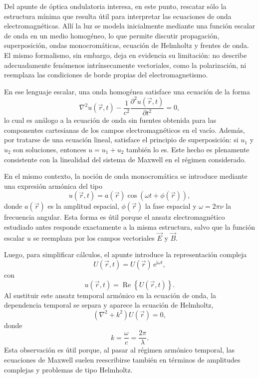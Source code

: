\documentclass[12pt,a4paper]{article}
\theoremstyle{definition}
\theoremstyle{plain}
\numberwithin{equation}{section}
\theoremstyle{remark}
\newcommand{\ii}{\mathrm{i}}
\newcommand{\ee}{\mathrm{e}}
\newcommand{\E}{\vec{E}}
\newcommand{\B}{\vec{B}}
\begin{document}
Del apunte de óptica ondulatoria interesa, en este punto, rescatar sólo la estructura mínima que resulta útil para interpretar las ecuaciones de onda electromagnéticas. Allí la luz se modela inicialmente mediante una función escalar de onda en un medio homogéneo, lo que permite discutir propagación, superposición, ondas monocromáticas, ecuación de Helmholtz y frentes de onda. El mismo formalismo, sin embargo, deja en evidencia su limitación: no describe adecuadamente fenómenos intrínsecamente vectoriales, como la polarización, ni reemplaza las condiciones de borde propias del electromagnetismo.

En ese lenguaje escalar, una onda homogénea satisface una ecuación de la forma
\begin{equation*}
    \nabla^2 u(\vec r,t)-\frac{1}{c^2}\frac{\partial^2 u(\vec r,t)}{\partial t^2}=0,
\end{equation*}
lo cual es análogo a la ecuación de onda sin fuentes obtenida para las componentes cartesianas de los campos electromagnéticos en el vacío. Además, por tratarse de una ecuación lineal, satisface el principio de superposición: si $u_1$ y $u_2$ son soluciones, entonces $u=u_1+u_2$ también lo es. Este hecho es plenamente consistente con la linealidad del sistema de Maxwell en el régimen considerado.

En el mismo contexto, la noción de onda monocromática se introduce mediante una expresión armónica del tipo
\begin{equation*}
    u(\vec r,t)=a(\vec r)\cos\left(\omega t+\phi(\vec r)\right),
\end{equation*}
donde $a(\vec r)$ es la amplitud espacial, $\phi(\vec r)$ la fase espacial y $\omega=2\pi\nu$ la frecuencia angular. Esta forma es útil porque el ansatz electromagnético estudiado antes responde exactamente a la misma estructura, salvo que la función escalar $u$ se reemplaza por los campos vectoriales $\E$ y $\B$.

Luego, para simplificar cálculos, el apunte introduce la representación compleja
\begin{equation*}
    U(\vec r,t)=U(\vec r)\,\ee^{\ii\omega t},
\end{equation*}
con
\begin{equation*}
    u(\vec r,t)=\operatorname{Re}\left\{U(\vec r,t)\right\}.
\end{equation*}
Al sustituir este ansatz temporal armónico en la ecuación de onda, la dependencia temporal se separa y aparece la ecuación de Helmholtz,
\begin{equation*}
    (\nabla^2+k^2)U(\vec r)=0,
\end{equation*}
donde
\begin{equation*}
    k=\frac{\omega}{c}=\frac{2\pi}{\lambda}.
\end{equation*}
Esta observación es útil porque, al pasar al régimen armónico temporal, las ecuaciones de Maxwell suelen reescribirse también en términos de amplitudes complejas y problemas de tipo Helmholtz.
\end{document}

